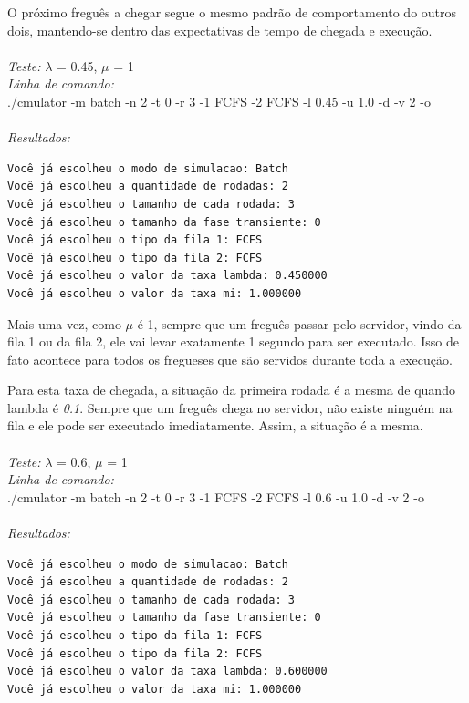 \documentclass[a4paper,10pt]{article}
\begin{document}
O próximo freguês a chegar segue o mesmo padrão de comportamento do outros dois, mantendo-se dentro das expectativas de tempo de chegada e execução.
\\
\\
\emph{Teste:} $\lambda$ = 0.45, $\mu$ = 1
\\
\emph{Linha de comando:}
\\
./cmulator -m batch -n 2 -t 0 -r 3 -1 FCFS -2 FCFS -l 0.45 -u 1.0 -d -v 2 -o
\\
\\
\emph{Resultados:}
\\\begin{verbatim}
Você já escolheu o modo de simulacao: Batch
Você já escolheu a quantidade de rodadas: 2
Você já escolheu o tamanho de cada rodada: 3
Você já escolheu o tamanho da fase transiente: 0
Você já escolheu o tipo da fila 1: FCFS
Você já escolheu o tipo da fila 2: FCFS
Você já escolheu o valor da taxa lambda: 0.450000
Você já escolheu o valor da taxa mi: 1.000000
\end{verbatim}

    Mais uma vez, como $\mu$ é 1, sempre que um freguês passar pelo servidor, vindo da fila 1 ou da fila 2, ele vai levar exatamente 1 segundo para ser executado. Isso de fato acontece para todos os fregueses que são servidos durante toda a execução.

    Para esta taxa de chegada, a situação da primeira rodada é a mesma de quando lambda é \emph{0.1}. Sempre que um freguês chega no servidor, não existe ninguém na fila e ele pode ser executado imediatamente. Assim, a situação é a mesma.
\\
\\
\emph{Teste:} $\lambda$ = 0.6, $\mu$ = 1
\\
\emph{Linha de comando:}
\\
./cmulator -m batch -n 2 -t 0 -r 3 -1 FCFS -2 FCFS -l 0.6 -u 1.0 -d -v 2 -o
\\
\\
\emph{Resultados:}
\\\begin{verbatim}
Você já escolheu o modo de simulacao: Batch
Você já escolheu a quantidade de rodadas: 2
Você já escolheu o tamanho de cada rodada: 3
Você já escolheu o tamanho da fase transiente: 0
Você já escolheu o tipo da fila 1: FCFS
Você já escolheu o tipo da fila 2: FCFS
Você já escolheu o valor da taxa lambda: 0.600000
Você já escolheu o valor da taxa mi: 1.000000
\end{verbatim}
\end{document}
